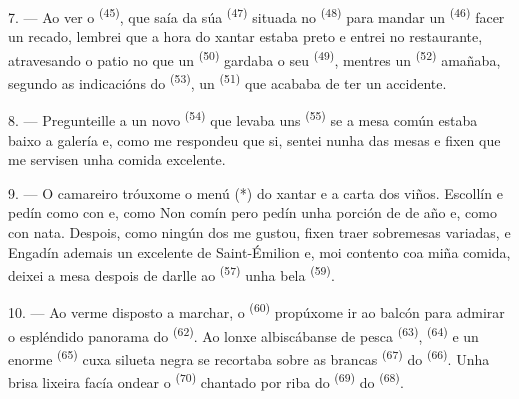 7. --- Ao ver o  \textsuperscript{(45)}, que saía da súa
 \textsuperscript{(47)} situada no  \textsuperscript{(48)}
para mandar un  \textsuperscript{(46)} facer un recado, lembrei que a
hora do xantar estaba preto e entrei no restaurante, atravesando o patio no que un
 \textsuperscript{(50)} gardaba o seu 
\textsuperscript{(49)}, mentres un  \textsuperscript{(52)} amañaba,
segundo as indicacións do  \textsuperscript{(53)}, un
 \textsuperscript{(51)} que acababa de ter un accidente.

8. --- Pregunteille a un novo  \textsuperscript{(54)} que levaba uns
 \textsuperscript{(55)} se a mesa común estaba baixo a
galería e, como me respondeu que si, sentei nunha das mesas e fixen que me servisen
unha comida excelente.


\VUsaut{4.0mm}
\VUsaut{3.0mm}

9. --- O camareiro tróuxome o menú (*) do xantar e a carta dos viños. Escollín e
pedín como  con  e, como
 Non comín  pero pedín unha
porción de  de año e, como  con
nata. Despois, como ningún dos  me gustou, fixen traer
sobremesas variadas,   e  Engadín
ademais un excelente  de Saint-Émilion e, moi contento coa miña comida,
deixei a mesa despois de darlle ao  \textsuperscript{(57)} unha bela
 \textsuperscript{(59)}.

10. --- Ao verme disposto a marchar, o  \textsuperscript{(60)}
propúxome ir ao balcón para admirar o espléndido panorama do 
\textsuperscript{(62)}. Ao lonxe albiscábanse  de pesca
\textsuperscript{(63)},  \textsuperscript{(64)} e un enorme
 \textsuperscript{(65)} cuxa silueta negra se recortaba sobre as
 brancas \textsuperscript{(67)} do 
\textsuperscript{(66)}. Unha brisa lixeira facía ondear o 
\textsuperscript{(70)} chantado por riba do  \textsuperscript{(69)}
do  \textsuperscript{(68)}.

